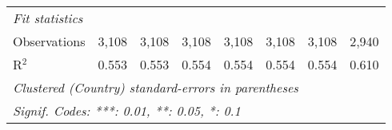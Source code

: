 \begin{tabular}{lccccccc}
   \midrule \emph{Fit statistics}\\
   Observations                                                             & 3,108         & 3,108         & 3,108         & 3,108         & 3,108         & 3,108         & 2,940\\  
   R$^2$                                                                    & 0.553         & 0.553         & 0.554         & 0.554         & 0.554         & 0.554         & 0.610\\  
   \midrule
   \multicolumn{8}{l}{\emph{Clustered (Country) standard-errors in parentheses}}\\
   \multicolumn{8}{l}{\emph{Signif. Codes: ***: 0.01, **: 0.05, *: 0.1}}\\
\end{tabular}
\par\endgroup


